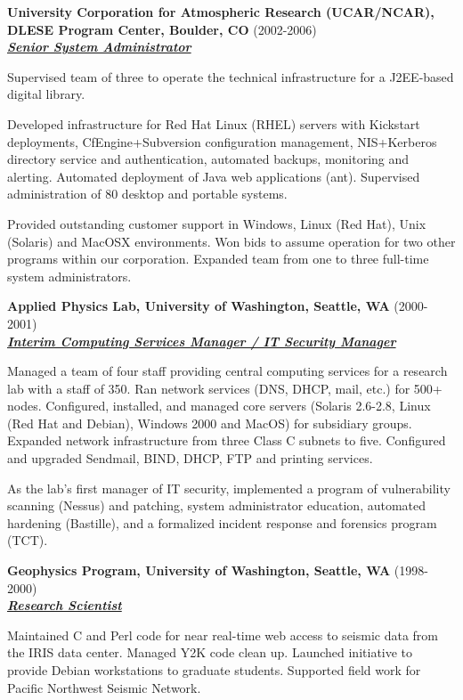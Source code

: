 \documentclass{article}
\newcommand{\employer}[3]{{ \textbf{#1} (#2)\\ \underline{\textbf{\emph{#3}}}\\ \nopagebreak }}
\newenvironment{achievements}{\begin{list}{\topsep 0pt \itemsep -2pt}} {\vspace*{4pt}\end{list}}
\begin{document}
\employer{University Corporation for Atmospheric Research (UCAR/NCAR), DLESE
Program Center, Boulder, CO}{2002-2006}{Senior System Administrator}
\begin{achievements}
    \item Supervised team of three to operate the technical infrastructure for a J2EE-based digital library.  
    \item Developed infrastructure for Red Hat Linux (RHEL) servers with Kickstart deployments, CfEngine+Subversion configuration management, NIS+Kerberos directory service and authentication, automated backups, monitoring and alerting.  Automated deployment of Java web applications (ant). Supervised administration of 80 desktop and portable systems.  
    \item Provided outstanding customer support in Windows, Linux (Red Hat), Unix (Solaris) and MacOSX environments.  Won bids to assume operation for two other programs within our corporation.  Expanded team from one to three full-time system administrators. 
\end{achievements}


\employer{Applied Physics Lab, University of Washington, Seattle, WA
}{2000-2001}{Interim Computing Services Manager / IT Security Manager}
\begin{achievements}
    \item Managed a team of four staff providing central computing services for a research lab with a staff of 350. Ran network services (DNS, DHCP, mail, etc.) for 500+ nodes. Configured, installed, and managed core servers (Solaris 2.6-2.8, Linux (Red Hat and Debian), Windows 2000 and MacOS) for subsidiary groups.  Expanded network infrastructure from three Class C subnets to five.  Configured and upgraded Sendmail, BIND, DHCP, FTP and printing services.
    \item As the lab's first manager of IT security, implemented a program of vulnerability scanning (Nessus) and patching, system administrator education, automated hardening (Bastille), and a formalized incident response and forensics program (TCT).
\end{achievements}

\employer{Geophysics Program, University of Washington, Seattle, WA}{1998-2000}{Research Scientist}
\begin{achievements}
    \item Maintained C and Perl code for near real-time web access to seismic data from the IRIS data center.  Managed Y2K code clean up.  Launched initiative to provide Debian workstations to graduate students.  Supported field work for Pacific Northwest Seismic Network.
\end{achievements}
\end{document}
